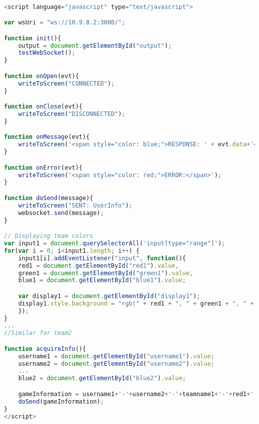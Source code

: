 \documentclass[Softwaredesign/Softwaredesign_main.tex]{subfiles}
\begin{document}
\begin{lstlisting}[language=JavaScript, caption={WebPage event handlers}, label=list:webpage_handlers]

<script language="javascript" type="text/javascript">

var wsUri = "ws://10.9.8.2:3000/";

function init(){
    output = document.getElementById("output");
    testWebSocket();
}

function onOpen(evt){
    writeToScreen("CONNECTED");
}

function onClose(evt){
    writeToScreen("DISCONNECTED");
}

function onMessage(evt){
    writeToScreen('<span style="color: blue;">RESPONSE: ' + evt.data+'</span>');
}

function onError(evt){
    writeToScreen('<span style="color: red;">ERROR:</span>');
}

function doSend(message){
    writeToScreen("SENT: UserInfo");
    websocket.send(message);
}

// Displaying team colors
var input1 = document.querySelectorAll('input[type="range"]');
for(var i = 0; i<input1.length; i++) {
    input1[i].addEventListener("input", function(){
    red1 = document.getElementById("red1").value,
    green1 = document.getElementById("green1").value,
    blue1 = document.getElementById("blue1").value;

    var display1 = document.getElementById("display1");
    display1.style.background = "rgb(" + red1 + ", " + green1 + ", " + blue1 + ")";
    });
}
...
//Similar for team2

function acquireInfo(){
    username1 = document.getElementById("username1").value;
    username2 = document.getElementById("username2").value;
    ...
    blue2 = document.getElementById("blue2").value;

    gameInformation = username1+'-'+username2+'-'+teamname1+'-'+red1+'-'+green1+'-'+blue1+'-'+username3+'-'+username4+'-'+teamname2+'-'+red2+'-'+green2+'-'+blue2+'#';
    doSend(gameInformation);
}
</script>
\end{lstlisting}
\end{document}
